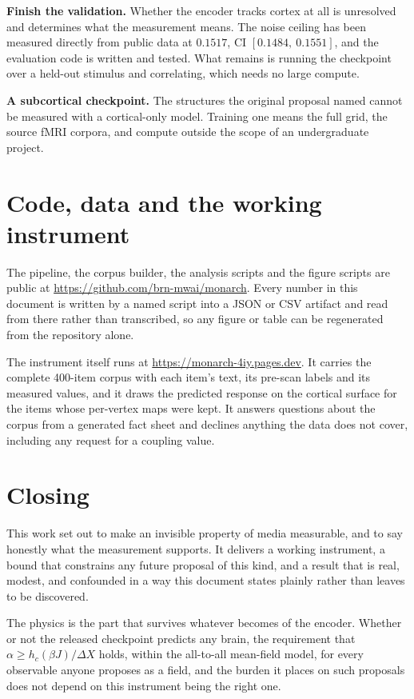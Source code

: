 \textbf{Finish the validation.} Whether the encoder tracks cortex at all is unresolved and
determines what the measurement means. The noise ceiling has been measured directly from
public data at $0.1517$, CI $[0.1484,\ 0.1551]$, and the evaluation code is written and
tested. What remains is running the checkpoint over a held-out stimulus and correlating, which
needs no large compute.

\textbf{A subcortical checkpoint.} The structures the original proposal named cannot be
measured with a cortical-only model. Training one means the full grid, the source fMRI
corpora, and compute outside the scope of an undergraduate project.

\section{Code, data and the working instrument}

The pipeline, the corpus builder, the analysis scripts and the figure scripts are public at
\url{https://github.com/brn-mwai/monarch}. Every number in this document is written by a
named script into a JSON or CSV artifact and read from there rather than transcribed, so any
figure or table can be regenerated from the repository alone.

The instrument itself runs at \url{https://monarch-4iy.pages.dev}. It carries the complete
400-item corpus with each item's text, its pre-scan labels and its measured values, and it
draws the predicted response on the cortical surface for the items whose per-vertex maps were
kept. It answers questions about the corpus from a generated fact sheet and declines anything
the data does not cover, including any request for a coupling value.

\section{Closing}

This work set out to make an invisible property of media measurable, and to say honestly what
the measurement supports. It delivers a working instrument, a bound that constrains any future
proposal of this kind, and a result that is real, modest, and confounded in a way this
document states plainly rather than leaves to be discovered.

The physics is the part that survives whatever becomes of the encoder. Whether or not the
released checkpoint predicts any brain, the requirement that $\alpha \ge h_c(\beta J)/\Delta
X$ holds, within the all-to-all mean-field model, for every observable anyone proposes as a
field, and the burden it places on such
proposals does not depend on this instrument being the right one.

